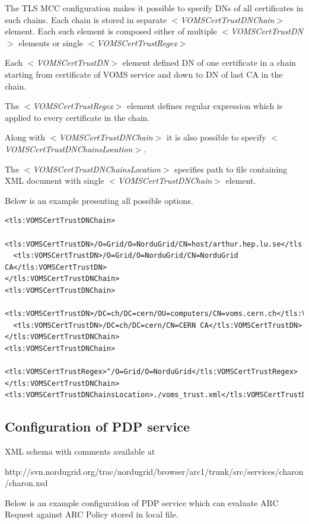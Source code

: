 \documentclass{article}                            %
\begin{document}
The TLS MCC configuration makes it possible to specify DNs of all certificates in such chains. Each chain is stored in separate \textit{$<$VOMSCertTrustDNChain$>$} element. Each such element is composed either of multiple \textit{$<$VOMSCertTrustDN$>$} elements or single \textit{$<$VOMSCertTrustRegex$>$}

Each \textit{$<$VOMSCertTrustDN$>$} element defined DN of one certificate in a chain starting from certificate of VOMS service and down to DN of last CA in the chain.

The \textit{$<$VOMSCertTrustRegex$>$} element defines regular expression which is applied to every certificate in the chain.

Along with \textit{$<$VOMSCertTrustDNChain$>$} it is also possible to specify \textit{$<$VOMSCertTrustDNChainsLocation$>$}.

The \textit{$<$VOMSCertTrustDNChainsLocation$>$} specifies path to file containing XML document with single \textit{$<$VOMSCertTrustDNChain$>$} element.

Below is an example presenting all possible options.

\begin{verbatim}
<tls:VOMSCertTrustDNChain> 
  <tls:VOMSCertTrustDN>/O=Grid/O=NorduGrid/CN=host/arthur.hep.lu.se</tls:VOMSCertTrustDN>
  <tls:VOMSCertTrustDN>/O=Grid/O=NorduGrid/CN=NorduGrid CA</tls:VOMSCertTrustDN>
</tls:VOMSCertTrustDNChain>
<tls:VOMSCertTrustDNChain>
  <tls:VOMSCertTrustDN>/DC=ch/DC=cern/OU=computers/CN=voms.cern.ch</tls:VOMSCertTrustDN>
  <tls:VOMSCertTrustDN>/DC=ch/DC=cern/CN=CERN CA</tls:VOMSCertTrustDN>
</tls:VOMSCertTrustDNChain>
<tls:VOMSCertTrustDNChain>
  <tls:VOMSCertTrustRegex>^/O=Grid/O=NorduGrid</tls:VOMSCertTrustRegex>
</tls:VOMSCertTrustDNChain>
<tls:VOMSCertTrustDNChainsLocation>./voms_trust.xml</tls:VOMSCertTrustDNChainsLocation>
\end{verbatim}


\subsection{Configuration of PDP service} %
\label{subsec:pdpservice_conf}
XML schema with comments available at 

http://svn.nordugrid.org/trac/nordugrid/browser/arc1/trunk/src/services/charon/charon.xsd

Below is an example configuration of PDP service which can evaluate ARC Request against ARC Policy stored in local file.
\end{document}

